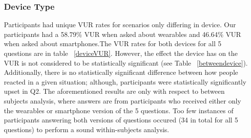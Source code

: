 \documentclass{acm_proc_article-sp}
\begin{document}
%
%

\subsubsection{Device Type}
Participants had unique VUR rates for scenarios only differing in device. Our participants had a 58.79\% VUR when asked about wearables and 46.64\% VUR when asked about smartphones.The VUR rates for both devices for all 5 questions are in table ~\ref{deviceVUR}. However, the effect the device has on the VUR is not considered to be statistically significant (see Table ~\ref{betweendevice}). Additionally, there is no statistically significant difference between how people reacted in a given situation; although, participants were statistically significantly upset in Q2.  The aforementioned results are only with respect to between subjects analysis, where answers are from participants who received either only the wearables or smartphone version of the 5 questions. Too few instances of participants answering both versions of questions occured (34 in total for all 5 questions) to perform a sound within-subjects analysis. 
\end{document}
